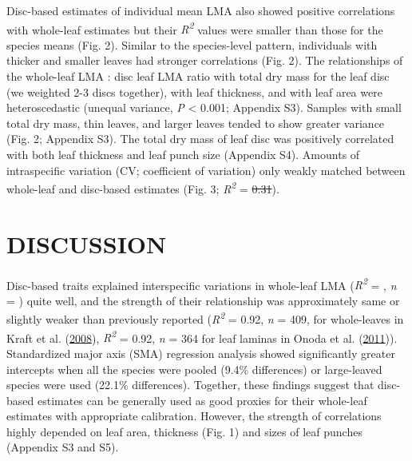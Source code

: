 \documentclass[
  12pt,
  a4paper,
,tablecaptionabove
]{scrartcl}
\providecommand{\DIFaddtex}[1]{{\protect\color{blue}\uwave{#1}}} %
\providecommand{\DIFdeltex}[1]{{\protect\color{red}\sout{#1}}}                      %
\providecommand{\DIFaddbegin}{} %
\providecommand{\DIFaddend}{} %
\providecommand{\DIFdelbegin}{} %
\providecommand{\DIFdelend}{} %
\providecommand{\DIFadd}[1]{\texorpdfstring{\DIFaddtex{#1}}{#1}} %
\providecommand{\DIFdel}[1]{\texorpdfstring{\DIFdeltex{#1}}{}} %
\newcommand{\DIFscaledelfig}{0.5}
\newlength{\DIFdelgraphicswidth} %
\newlength{\DIFdelgraphicsheight} %
\newcommand{\DIFaddincludegraphics}[2][]{{\color{blue}\fbox{\DIFOincludegraphics[#1]{#2}}}} %
\newcommand{\DIFdelincludegraphics}[2][]{%
\sbox{\DIFdelgraphicsbox}{\DIFOincludegraphics[#1]{#2}}%
\settoboxwidth{\DIFdelgraphicswidth}{\DIFdelgraphicsbox} %
\settoboxtotalheight{\DIFdelgraphicsheight}{\DIFdelgraphicsbox} %
\scalebox{\DIFscaledelfig}{%
\parbox[b]{\DIFdelgraphicswidth}{\usebox{\DIFdelgraphicsbox}\\[-\baselineskip] \rule{\DIFdelgraphicswidth}{0em}}\llap{\resizebox{\DIFdelgraphicswidth}{\DIFdelgraphicsheight}{%
\setlength{\unitlength}{\DIFdelgraphicswidth}%
\begin{picture}(1,1)%
\thicklines\linethickness{2pt} %
{\color[rgb]{1,0,0}\put(0,0){\framebox(1,1){}}}%
{\color[rgb]{1,0,0}\put(0,0){\line( 1,1){1}}}%
{\color[rgb]{1,0,0}\put(0,1){\line(1,-1){1}}}%
\end{picture}%
}\hspace*{3pt}}} %
} %
\DeclareRobustCommand{\DIFaddbegin}{\DIFOaddbegin \let\includegraphics\DIFaddincludegraphics} %
\DeclareRobustCommand{\DIFaddend}{\DIFOaddend \let\includegraphics\DIFOincludegraphics} %
\DeclareRobustCommand{\DIFdelbegin}{\DIFOdelbegin \let\includegraphics\DIFdelincludegraphics} %
\DeclareRobustCommand{\DIFdelend}{\DIFOaddend \let\includegraphics\DIFOincludegraphics} %
\begin{document}
Disc-based estimates of individual mean LMA also showed positive
correlations with whole-leaf estimates but their
\emph{R\textsuperscript{2}} values were smaller than those for the
species means (Fig. 2). Similar to the species-level pattern,
individuals with thicker and smaller leaves had stronger correlations
(Fig. 2). The relationships of the whole-leaf LMA : disc leaf LMA ratio
with total dry mass for the leaf disc (we weighted 2-3 discs together),
with leaf thickness, and with leaf area were heteroscedastic (unequal
variance, \emph{P} \textless{} 0.001; Appendix S3). Samples with small
total dry mass, thin leaves, and larger leaves tended to show greater
variance (Fig. 2; Appendix S3). The total dry mass of leaf disc was
positively correlated with both leaf thickness and leaf punch size
(Appendix S4). Amounts of intraspecific variation (CV; coefficient of
variation) only weakly matched between whole-leaf and disc-based
estimates (Fig. 3; \emph{R\textsuperscript{2}} = \DIFdelbegin \DIFdel{0.31}\DIFdelend \DIFaddbegin \DIFadd{0.32}\DIFaddend ).

\hypertarget{discussion}{%
\section{DISCUSSION}\label{discussion}}

Disc-based traits explained interspecific variations in whole-leaf LMA
(\emph{R\textsuperscript{2}} = , \emph{n} = ) quite well, and the
strength of their relationship was approximately same or slightly weaker
than previously reported (\emph{R\textsuperscript{2}} = 0.92, \emph{n} =
409, for whole-leaves in Kraft et al.
(\protect\hyperlink{ref-Kraft2008}{2008}), \emph{R\textsuperscript{2}} =
0.92, \emph{n} = 364 for leaf laminas in Onoda et al.
(\protect\hyperlink{ref-Onoda2011}{2011})). Standardized major axis
(SMA) regression analysis showed significantly greater intercepts when
all the species were pooled (9.4\% differences) or large-leaved species
were used (22.1\% differences). Together, these findings suggest that
disc-based estimates can be generally used as good proxies for their
whole-leaf estimates with appropriate calibration. However, the strength
of correlations highly depended on leaf area, thickness (Fig. 1) and
sizes of leaf punches (Appendix S3 and S5).
\end{document}
